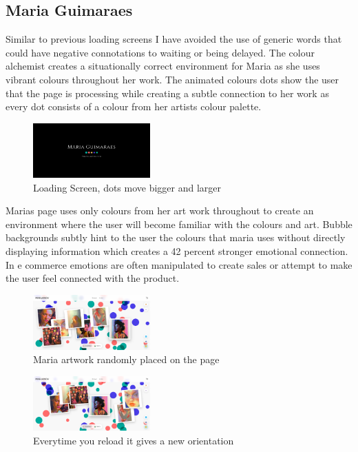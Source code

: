 \documentclass[]{project_final}
\begin{document}
\subsection{Maria Guimaraes}
Similar to previous loading screens I have avoided the use of generic words that could have negative connotations to waiting or being delayed. The colour alchemist creates a situationally correct environment for Maria as she uses vibrant colours throughout her work.
The animated colours dots show the user that the page is processing while creating a subtle connection to her work as every dot consists of a colour from her artists colour palette.

\begin{figure}[ht!]
  \centering
  \includegraphics[width=0.4\textwidth]{AG26.png}
  \vspace*{0.0cm}
  \caption{Loading Screen, dots move bigger and larger}
  \label{fig:1}
\end{figure}

Marias page uses only colours from her art work throughout to create an environment where the user will become familiar with the colours and art. Bubble backgrounds subtly hint to the user the colours that maria uses without directly displaying information which creates a 42 percent stronger emotional connection.
In e commerce emotions are often manipulated to create sales or attempt to make the user feel connected with the product.

\begin{figure}[ht!]
  \centering
  \includegraphics[width=0.4\textwidth]{AG27.png}
  \vspace*{0.0cm}
  \caption{Maria artwork randomly placed on the page}
  \label{fig:1}
\end{figure}
\begin{figure}[ht!]
  \centering
  \includegraphics[width=0.4\textwidth]{AG28.png}
  \vspace*{0.0cm}
  \caption{Everytime you reload it gives a new orientation}
  \label{fig:1}
\end{figure}
\end{document}
